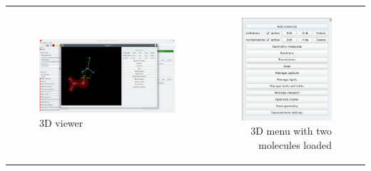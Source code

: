 \documentclass[10pt]{article}
\begin{document}
\hspace*{-1cm}
\begin{tabular}{lr}
\begin{minipage}{.7\linewidth}
    \begin{figure}[H]
        \begin{center}
            \includegraphics[width=0.8\linewidth]{damqt320_3D_display_menu.png}
        \end{center}
        \vspace*{3mm}
        \caption{3D viewer \label{fig:4_2}}
    \end{figure}
\end{minipage}
&
\begin{minipage}{.3\linewidth}
    \begin{figure}[H]
        \begin{center}
            \includegraphics[width=0.7\linewidth]{damqt320_3D_display_menu_2.png}
        \end{center}
        \vspace*{-1mm}
        \caption{3D menu with two molecules loaded \label{fig:4_1_1}}
    \end{figure}
\end{minipage}
\end{tabular}
\vspace*{5mm}
\end{document}
